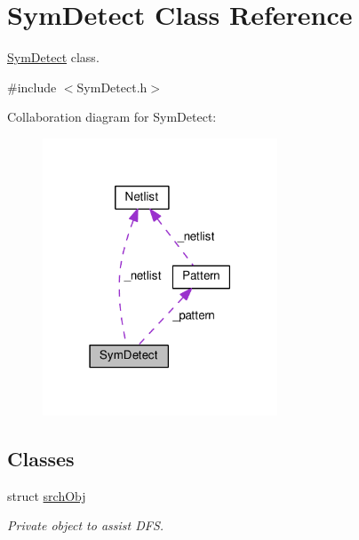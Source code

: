 \hypertarget{classSymDetect}{}\section{Sym\+Detect Class Reference}
\label{classSymDetect}


\hyperlink{classSymDetect}{Sym\+Detect} class.  




{\ttfamily \#include $<$Sym\+Detect.\+h$>$}



Collaboration diagram for Sym\+Detect\+:\nopagebreak
\begin{figure}[H]
\begin{center}
\leavevmode
\includegraphics[width=198pt]{classSymDetect__coll__graph}
\end{center}
\end{figure}
\subsection*{Classes}
\begin{DoxyCompactItemize}
\item 
struct \hyperlink{structSymDetect_1_1srchObj}{srch\+Obj}
\begin{DoxyCompactList}\small\item\em Private object to assist D\+FS. \end{DoxyCompactList}\end{DoxyCompactItemize}

